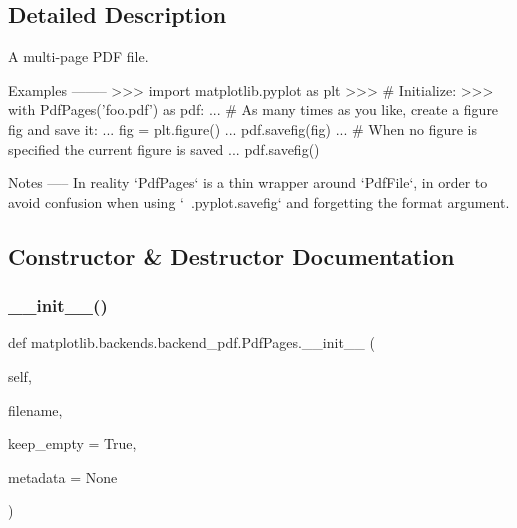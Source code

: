 \subsection{Detailed Description}
\begin{DoxyVerb}A multi-page PDF file.

Examples
--------
>>> import matplotlib.pyplot as plt
>>> # Initialize:
>>> with PdfPages('foo.pdf') as pdf:
...     # As many times as you like, create a figure fig and save it:
...     fig = plt.figure()
...     pdf.savefig(fig)
...     # When no figure is specified the current figure is saved
...     pdf.savefig()

Notes
-----
In reality `PdfPages` is a thin wrapper around `PdfFile`, in order to avoid
confusion when using `~.pyplot.savefig` and forgetting the format argument.
\end{DoxyVerb}
 

\subsection{Constructor \& Destructor Documentation}
\mbox{\label{classmatplotlib_1_1backends_1_1backend__pdf_1_1PdfPages_a6d5caaea4a0cbc5d2d07d9e2b4042dcd}} 
\subsubsection{\texorpdfstring{\+\_\+\+\_\+init\+\_\+\+\_\+()}{\_\_init\_\_()}}
{\footnotesize\ttfamily def matplotlib.\+backends.\+backend\+\_\+pdf.\+Pdf\+Pages.\+\_\+\+\_\+init\+\_\+\+\_\+ (\begin{DoxyParamCaption}\item[{}]{self,  }\item[{}]{filename,  }\item[{}]{keep\+\_\+empty = {\ttfamily True},  }\item[{}]{metadata = {\ttfamily None} }\end{DoxyParamCaption})}

